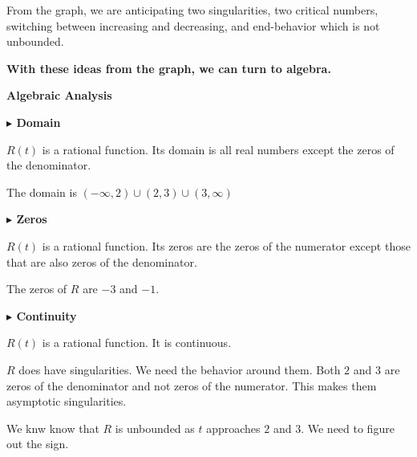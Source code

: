 \documentclass{ximera}
\begin{document}
From the graph, we are anticipating two singularities, two critical numbers, switching between increasing and decreasing, and end-behavior which is not unbounded. 








\textbf{\textcolor{red!75!green}{With these ideas from the graph, we can turn to algebra.}} 





\textbf{\textcolor{purple!65!blue}{Algebraic Analysis}} 
























\textbf{\textcolor{blue!55!black}{$\blacktriangleright$ Domain}} 

$R(t)$ is a rational function.  Its domain is all real numbers except the zeros of the denominator. 

The domain is $(-\infty, 2) \cup (2,3) \cup (3, \infty)$  














\textbf{\textcolor{blue!55!black}{$\blacktriangleright$ Zeros}} 


$R(t)$ is a rational function.  Its zeros are the zeros of the numerator except those that are also zeros of the denominator. 


The zeros of $R$ are $-3$ and $-1$. 






\textbf{\textcolor{blue!55!black}{$\blacktriangleright$ Continuity}} 


$R(t)$ is a rational function.  It is continuous. 


$R$ does have singularities.  We need the behavior around them.   Both $2$ and $3$ are zeros of the denominator and not zeros of the numerator.  This makes them asymptotic singularities. 


We knw know that $R$ is unbounded as $t$ approaches $2$ and $3$.  We need to figure out the sign. 
\end{document}

